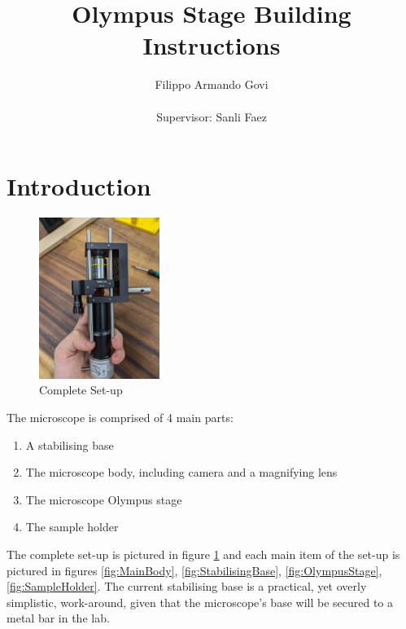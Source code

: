 \documentclass[runningheads]{llncs}
\begin{document}
%
\title{Olympus Stage Building Instructions}
%
%
\author{Filippo Armando Govi  \\~\\ Supervisor: Sanli Faez }

%
\maketitle              %
%
%
%
%
\doublespacing

\section*{Introduction}


\begin{figure}
    \centering
    \includegraphics[width=0.35\textwidth]{images/main_body.jpg}
    \caption{Complete Set-up}
    \label{fig:CompleteSetup}
\end{figure}

The microscope is comprised of 4 main parts:
\begin{enumerate}
    \item A stabilising base 
    \item The microscope body, including camera and a magnifying lens
    \item The microscope Olympus stage 
    \item The sample holder 
\end{enumerate}

The complete set-up is pictured in figure \ref{fig:CompleteSetup} and each main item of the set-up is pictured in figures \ref{fig:MainBody}, \ref{fig:StabilisingBase}, \ref{fig:OlympusStage}, \ref{fig:SampleHolder}. The current stabilising base is a practical, yet overly simplistic, work-around, given that the microscope's base will be secured to a metal bar in the lab. 
\end{document}
